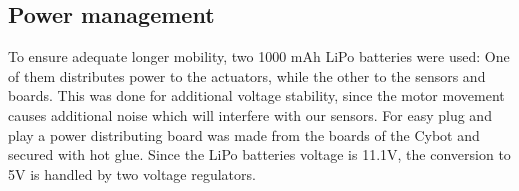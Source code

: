 \documentclass[class=article, crop=false]{standalone}
\begin{document}
\subsection{Power management}\label{subsec:power}
To ensure adequate longer mobility, two 1000 mAh LiPo batteries were used: One of them distributes power to the actuators, while the other to the sensors and boards. This was done for additional voltage stability, since the motor movement causes additional noise which will interfere with our sensors. For easy plug and play a power distributing board was made from the boards of the Cybot and secured with hot glue. Since the LiPo batteries voltage is 11.1V, the conversion to 5V is handled by two voltage regulators.
\end{document}
